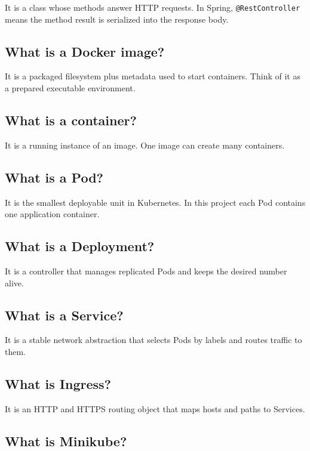 \documentclass[a4paper,11pt]{article}
\begin{document}
It is a class whose methods answer HTTP requests. In Spring, \texttt{@RestController} means the method result is serialized into the response body.

\subsection{What is a Docker image?}

It is a packaged filesystem plus metadata used to start containers. Think of it as a prepared executable environment.

\subsection{What is a container?}

It is a running instance of an image. One image can create many containers.

\subsection{What is a Pod?}

It is the smallest deployable unit in Kubernetes. In this project each Pod contains one application container.

\subsection{What is a Deployment?}

It is a controller that manages replicated Pods and keeps the desired number alive.

\subsection{What is a Service?}

It is a stable network abstraction that selects Pods by labels and routes traffic to them.

\subsection{What is Ingress?}

It is an HTTP and HTTPS routing object that maps hosts and paths to Services.

\subsection{What is Minikube?}
\end{document}
